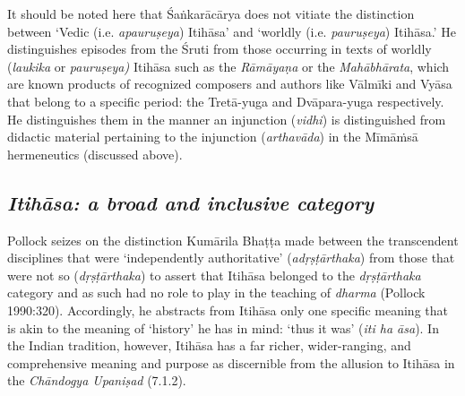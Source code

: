 It should be noted here that Śaṅkarācārya does not vitiate the distinction between ‘Vedic (i.e. \textit{apauruṣeya}) Itihāsa’ and ‘worldly (i.e. \textit{pauruṣeya}) Itihāsa.’ He distinguishes episodes from the Śruti from those occurring in texts of worldly (\textit{laukika} or \textit{pauruṣeya)} Itihāsa such as the \textit{Rāmāyaṇa} or the \textit{Mahābhārata}, which are known products of recognized composers and authors like Vālmīki and Vyāsa that belong to a specific period: the Tretā-yuga and Dvāpara-yuga respectively. He distinguishes them in the manner an injunction (\textit{vidhi}) is distinguished from didactic material pertaining to the injunction (\textit{arthavāda}) in the Mīmāṁsā hermeneutics (discussed above).


\subsection*{\textit{Itihāsa: a broad and inclusive category}}

Pollock seizes on the distinction Kumārila Bhaṭṭa made between the transcendent disciplines that were ‘independently authoritative’ (\textit{adṛṣṭārthaka}) from those that were not so (\textit{dṛṣṭārthaka}) to assert that Itihāsa belonged to the \textit{dṛṣṭārthaka} category and as such had no role to play in the teaching of \textit{dharma} (Pollock 1990:320). Accordingly, he abstracts from Itihāsa only one specific meaning that is akin to the meaning of ‘history’ he has in mind: ‘thus it was’ (\textit{iti ha āsa}). In the Indian tradition, however, Itihāsa has a far richer, wider-ranging, and comprehensive meaning and purpose as discernible from the allusion to Itihāsa in the \textit{Chāndogya Upaniṣad} (7.1.2). 

